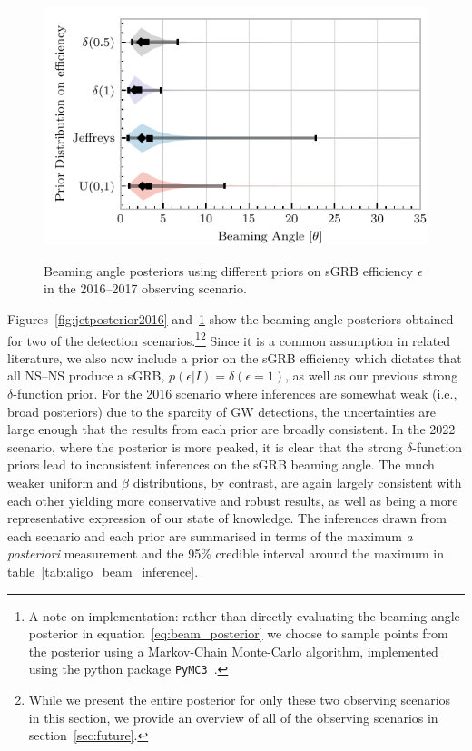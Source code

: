 \documentclass[twocolumn,nofootinbib]{revtex4-1}
\newcommand{\BNS}{\ac{NS}--\ac{NS}\xspace}
\newcommand{\dwnote}[1]{{\color{dwnote}{[\textbf{DW}: #1]}}}
\renewcommand{\dwnote}{}
\begin{document}
\begin{figure}
\centering
{\includegraphics[width=\linewidth]{O2_beaming_posteriors_violin.pdf}}
\caption{Beaming angle posteriors using different priors on \ac{sGRB} efficiency $\epsilon$ in the 2016--2017 observing scenario.
    \label{fig:jetposterior2022}}
\end{figure}

Figures~\ref{fig:jetposterior2016} and~\ref{fig:jetposterior2022} show
the beaming angle posteriors obtained for two of the detection
scenarios.\footnote{
    A note on implementation: rather than directly evaluating
    the beaming angle posterior in equation~\ref{eq:beam_posterior} we
    choose to sample points from the posterior using a Markov-Chain
    Monte-Carlo algorithm, implemented using the python package
    \texttt{PyMC3}~\cite{salvatier2016probabilistic}.
}\footnote{
    While we present the entire posterior for only these two
    observing scenarios in this section, we provide an overview of all
    of the observing scenarios in section~\ref{sec:future}.}
Since it is a common assumption in related literature, we also now include
a prior on the \ac{sGRB} efficiency which dictates that all \BNS produce a
\ac{sGRB}, $p(\epsilon|I)=\delta(\epsilon=1)$, as well as our previous
strong $\delta$-function prior.  For the 2016 scenario where
inferences are somewhat weak (i.e., broad posteriors) due to the
sparcity of \ac{GW} detections, the uncertainties are large enough
that the results from each prior are broadly consistent.  In the 2022
scenario, where the posterior is more peaked, it is clear that the
strong $\delta$-function priors lead to inconsistent inferences on the
\ac{sGRB} beaming angle.  The much weaker uniform and $\beta$
distributions, by contrast, are again largely consistent with each
other yielding more conservative and robust results, as well as being
a more representative expression of our state of knowledge.  The
inferences drawn from each scenario and each prior are summarised in
terms of the maximum \emph{a posteriori} measurement and the 95\%
credible interval around the maximum in
table~\ref{tab:aligo_beam_inference}.
\end{document}
